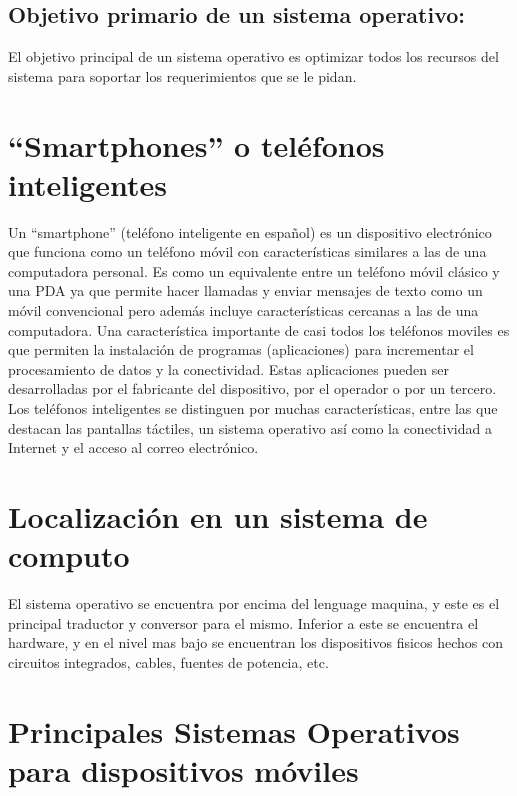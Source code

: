 \documentclass{bmcart}
\begin{document}
\subsection*{Objetivo primario de un sistema operativo:}

El objetivo principal de un sistema operativo es optimizar todos los recursos del sistema para soportar los requerimientos que se le pidan.\cite{tanenbaum1998sistemas}\cite{luis2001sistemas}


\section*{“Smartphones” o teléfonos inteligentes}

Un “smartphone” (teléfono inteligente en español) es un dispositivo electrónico que
funciona como un teléfono móvil con características similares a las de una computadora
personal. Es como un equivalente entre un teléfono móvil clásico y una PDA
ya que permite hacer llamadas y enviar mensajes de texto como un móvil
convencional pero además incluye características cercanas a las de una computadora. 
Una característica importante de casi todos los teléfonos moviles es que
permiten la instalación de programas (aplicaciones) para incrementar el procesamiento de datos y la
conectividad. Estas aplicaciones pueden ser desarrolladas por el fabricante del
dispositivo, por el operador o por un tercero.
Los teléfonos inteligentes se distinguen por muchas características, entre las que
destacan las pantallas táctiles, un sistema operativo así como la conectividad a
Internet y el acceso al correo electrónico.\cite{del2009sistemas}


\section*{Localización en un sistema de computo}

El sistema operativo se encuentra por encima del lenguage maquina, y este es el principal traductor y conversor para el mismo.
Inferior a este se encuentra el hardware, y en el nivel mas bajo se encuentran los dispositivos fisicos hechos con circuitos integrados, cables, fuentes de potencia, etc.\cite{tanenbaum2003sistemas}


\section*{Principales Sistemas Operativos para dispositivos móviles}
\end{document}
